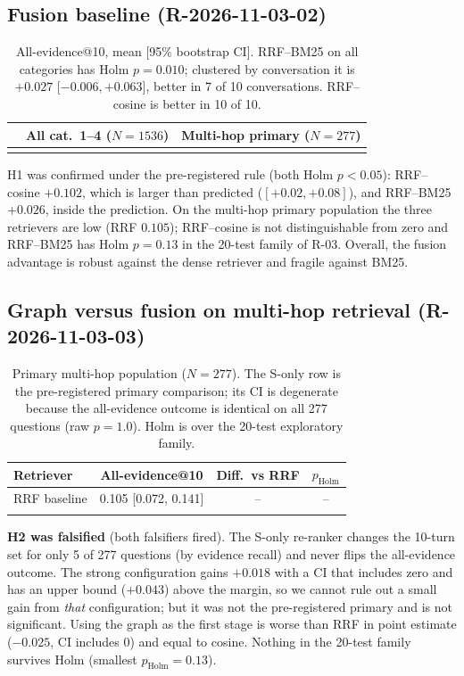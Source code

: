 \documentclass[10pt]{article}
\begin{document}
\subsection{Fusion baseline (R-2026-11-03-02)}
\begin{table}[h]
\centering\small
\begin{tabular}{lcc}\toprule
 & All cat.\ 1--4 ($N{=}1536$) & Multi-hop primary ($N{=}277$)\\\midrule
\\\bottomrule
\end{tabular}
\caption{All-evidence@10, mean [95\% bootstrap CI]. RRF--BM25 on all categories has Holm $p=0.010$; clustered by conversation it is $+0.027$ [$-0.006,+0.063$], better in 7 of 10 conversations. RRF--cosine is better in 10 of 10.}\label{tab:rrf}
\end{table}
H1 was confirmed under the pre-registered rule (both Holm $p<0.05$): RRF--cosine $+0.102$, which is larger than predicted ($[+0.02,+0.08]$), and RRF--BM25 $+0.026$, inside the prediction. On the multi-hop primary population the three retrievers are low (RRF $0.105$); RRF--cosine is not distinguishable from zero and RRF--BM25 has Holm $p=0.13$ in the 20-test family of R-03. Overall, the fusion advantage is robust against the dense retriever and fragile against BM25.

\subsection{Graph versus fusion on multi-hop retrieval (R-2026-11-03-03)}
\begin{table}[h]
\centering\small
\begin{tabular}{lccc}\toprule
Retriever & All-evidence@10 & Diff.\ vs RRF & $p_{\mathrm{Holm}}$\\\midrule
RRF baseline & 0.105 [0.072, 0.141] & -- & --\\
\\\bottomrule
\end{tabular}
\caption{Primary multi-hop population ($N=277$). The S-only row is the pre-registered primary comparison; its CI is degenerate because the all-evidence outcome is identical on all 277 questions (raw $p=1.0$). Holm is over the 20-test exploratory family.}\label{tab:graph}
\end{table}
\textbf{H2 was falsified} (both falsifiers fired). The S-only re-ranker changes the 10-turn set for only 5 of 277 questions (by evidence recall) and never flips the all-evidence outcome. The strong configuration gains $+0.018$ with a CI that includes zero and has an upper bound ($+0.043$) above the margin, so we cannot rule out a small gain from \emph{that} configuration; but it was not the pre-registered primary and is not significant. Using the graph as the first stage is worse than RRF in point estimate ($-0.025$, CI includes 0) and equal to cosine. Nothing in the 20-test family survives Holm (smallest $p_{\mathrm{Holm}}=0.13$).
\end{document}
